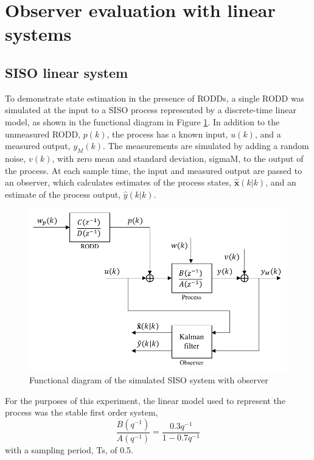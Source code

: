 \section{Observer evaluation with linear systems} \label{sec:sim-obs-lin}

\subsection{SISO linear system} \label{sim-obs-lin-1}

To demonstrate state estimation in the presence of \gls{RODD}s, a single \gls{RODD} was simulated at the input to a SISO process represented by a discrete-time linear model, as shown in the functional diagram in Figure \ref{fig:sim-sys-diag-siso}. In addition to the unmeasured \gls{RODD}, $p(k)$, the process has a known input, $u(k)$, and a measured output, $y_M(k)$. The measurements are simulated by adding a random noise, $v(k)$, with zero mean and standard deviation, \gls{sigmaM}, to the output of the process. At each sample time, the input and measured output are passed to an observer, which calculates estimates of the process states, $\hat{\mathbf{x}}(k|k)$, and an estimate of the process output, $\hat{y}(k|k)$. %
\begin{figure}[htp]
	\centering
	\includegraphics[width=11.5cm]{images/sim-sys-diag-siso.pdf}
	\caption{Functional diagram of the simulated \gls{SISO} system with observer}
	\label{fig:sim-sys-diag-siso}
\end{figure}

For the purposes of this experiment, the linear model used to represent the process was the stable first order system,
\begin{equation}
	\frac{B(q^{-1})}{A(q^{-1})} = \frac{0.3q^{-1}}{1-0.7q^{-1}}
\end{equation}
with a sampling period, \gls{Ts}, of 0.5.

